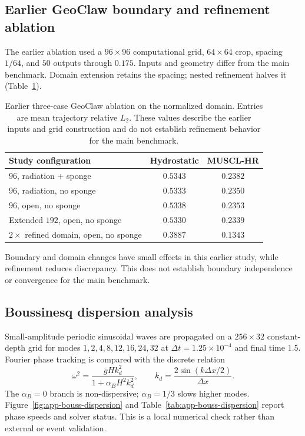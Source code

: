 \FloatBarrier
\subsection{Earlier GeoClaw boundary and refinement ablation}
\label{app:legacy-geoclaw-ablation}

The earlier ablation used a $96\times96$ computational grid, $64\times64$ crop, spacing $1/64$, and $50$ outputs through $0.175$. Inputs and geometry differ from the main benchmark. Domain extension retains the spacing; nested refinement halves it (Table~\ref{tab:app-legacy-geoclaw-ablation}).

\begin{table}[pos=!htbp]
\centering
\caption{Earlier three-case GeoClaw ablation on the normalized domain. Entries are mean trajectory relative $L_2$. These values describe the earlier inputs and grid construction and do not establish refinement behavior for the main benchmark.}
\label{tab:app-legacy-geoclaw-ablation}
\small
\begin{tabular}{lcc}
    \toprule
    Study configuration & Hydrostatic & MUSCL-HR \\
    \midrule
    $96$, radiation + sponge & $0.5343$ & $0.2382$ \\
    $96$, radiation, no sponge & $0.5333$ & $0.2350$ \\
    $96$, open, no sponge & $0.5338$ & $0.2353$ \\
    Extended $192$, open, no sponge & $0.5330$ & $0.2339$ \\
    $2\times$ refined domain, open, no sponge & $0.3887$ & $0.1343$ \\
    \bottomrule
\end{tabular}
\end{table}

Boundary and domain changes have small effects in this earlier study, while refinement reduces discrepancy. This does not establish boundary independence or convergence for the main benchmark.

\FloatBarrier
\subsection{Boussinesq dispersion analysis}
\label{app:boussinesq-dispersion}
Small-amplitude periodic sinusoidal waves are propagated on a $256 \times 32$ constant-depth grid for modes $1, 2, 4, 8, 12, 16, 24, 32$ at $\Delta t = 1.25 \times 10 ^ {-4}$ and final time $1.5$. Fourier phase tracking is compared with the discrete relation
\begin{equation}
    \omega ^ 2 =
    \frac{g H k_d ^ 2}{1 + \alpha_B H ^ 2 k_d ^ 2},
    \qquad
    k_d = \frac{2 \sin(k \Delta x / 2)}{\Delta x}.
\end{equation}
The $\alpha_B=0$ branch is non-dispersive; $\alpha_B=1/3$ slows higher modes. Figure~\ref{fig:app-bouss-dispersion} and Table~\ref{tab:app-bouss-dispersion} report phase speeds and solver status. This is a local numerical check rather than external or event validation.


